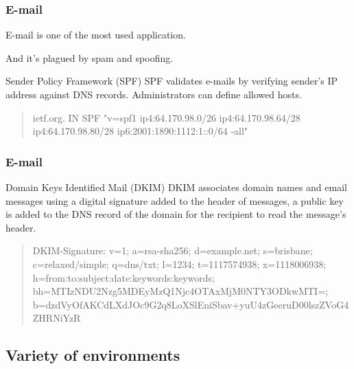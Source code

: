 \begin{frame}
\frametitle{E-mail}
\begin{center}
E-mail is one of the most used application.
\par
And it's plagued by spam and spoofing.
\end{center}
\begin{block}{Sender Policy Framework (SPF)}
SPF validates e-mails by verifying sender's IP address against DNS records.
Administrators can define allowed hosts.
\begin{quote}
ietf.org. IN SPF "v=spf1 ip4:64.170.98.0/26 ip4:64.170.98.64/28 ip4:64.170.98.80/28 ip6:2001:1890:1112:1::0/64 -all"
\end{quote}
\end{block}
\end{frame}

\begin{frame}
\frametitle{E-mail}
\begin{block}{Domain Keys Identified Mail (DKIM)}
DKIM associates domain names and email messages using a digital signature
added to the header of messages, a public key is added to the DNS record of the
domain for the recipient to read the message's header.
\begin{quote}
DKIM-Signature: v=1; a=rsa-sha256; d=example.net; s=brisbane;
c=relaxed/simple; q=dns/txt; l=1234; t=1117574938; x=1118006938;
h=from:to:subject:date:keywords:keywords;
bh=MTIzNDU2Nzg5MDEyMzQ1Njc4OTAxMjM0NTY3ODkwMTI=;
b=dzdVyOfAKCdLXdJOc9G2q8LoXSlEniSbav+yuU4zGeeruD00lszZVoG4ZHRNiYzR
\end{quote}
\end{block}
\end{frame}

\subsection{Variety of environments}

